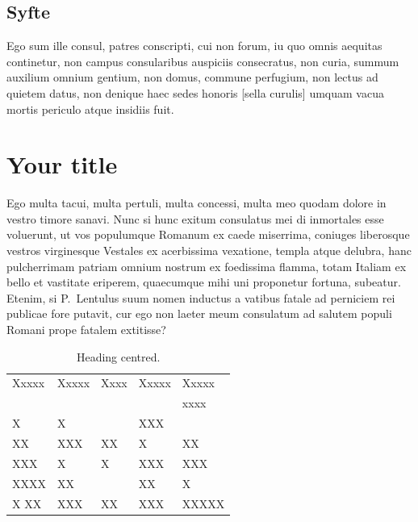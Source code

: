 \documentclass[a4paper,12pt,twoside,swedish]{report}
\begin{document}
\section{Syfte}

Ego sum ille consul, patres
conscripti, cui non forum, iu quo omnis aequitas continetur, non campus
consularibus auspiciis consecratus, non curia, summum auxilium omnium
gentium, non domus, commune perfugium, non lectus ad quietem datus, non
denique haec sedes honoris [sella curulis] umquam vacua mortis periculo
atque insidiis fuit. 


\chapter{Your title}

 Ego multa tacui, multa pertuli, multa concessi,
multa meo quodam dolore in vestro timore sanavi. Nunc si hunc exitum
consulatus mei di inmortales esse voluerunt, ut vos populumque Romanum
ex caede miserrima, coniuges liberosque vestros virginesque Vestales ex
acerbissima vexatione, templa atque delubra, hanc pulcherrimam patriam
omnium nostrum ex foedissima flamma, totam Italiam ex bello et vastitate
eriperem, quaecumque mihi uni proponetur fortuna, subeatur. Etenim, si
P.~Lentulus suum nomen inductus a vatibus fatale ad perniciem rei
publicae fore putavit, cur ego non laeter meum consulatum ad salutem
populi Romani prope fatalem extitisse?

\begin{table}[htbp]
  \caption{Heading centred.}
  \label{table_example}
  \begin{tabular*}{\hsize}{lllll}
\hline
Xxxxx & Xxxxx & Xxxx & Xxxxx & Xxxxx \\
      &       &      &       & xxxx  \\
\hline
X     & X     &      & XXX   &       \\
XX    & XXX   & XX   & X     & XX    \\
XXX   & X     & X    & XXX   & XXX   \\
XXXX  & XX    &      & XX    & X     \\
X XX  & XXX   & XX   & XXX   & XXXXX \\
\hline
  \end{tabular*}
\end{table}
\end{document}
